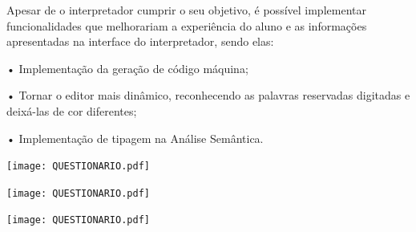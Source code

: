\documentclass[12pt,oneside,a4paper,chapter=TITLE,section=TITLE,sumario=tradicional]{abntex2}
\begin{document}
Apesar de o interpretador cumprir o seu objetivo, é possível implementar funcionalidades que melhorariam a experiência do aluno e as informações apresentadas na interface do interpretador, sendo elas:


•	Implementação da geração de código máquina;

•	Tornar o editor mais dinâmico, reconhecendo as palavras reservadas digitadas e deixá-las de cor diferentes;

•	Implementação de tipagem na Análise Semântica.





\texttt{[image: QUESTIONARIO.pdf]}

\texttt{[image: QUESTIONARIO.pdf]}

\texttt{[image: QUESTIONARIO.pdf]}

\begin{figure}[htb]
\end{figure}


\begin{figure}[htb]
\end{figure}

\begin{figure}[htb]
\end{figure}

\begin{figure}[htb]
\end{figure}
\end{document}
